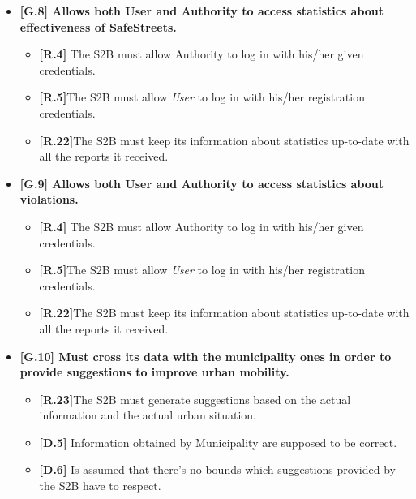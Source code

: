 \begin{itemize}
    \newpage
    
\item \textbf{{[G.8]} Allows both User and Authority to access statistics about effectiveness of SafeStreets.}

    \begin{itemize}
           
 \item \textbf{[R.4]} The S2B must allow Authority to log in with his/her given credentials.
        
        
        \item \textbf{[R.5]}The S2B must allow \textit{User} to log in with his/her registration credentials.
        
        \item \textbf{[R.22]}The S2B must keep its information about statistics up-to-date with all the reports it received.
        
    \end{itemize}
    
\item \textbf{{[G.9]} Allows both User and Authority to access statistics about violations.}
     \begin{itemize}
       \item \textbf{[R.4]} The S2B must allow Authority to log in with his/her given credentials.
        
        
        \item \textbf{[R.5]}The S2B must allow \textit{User} to log in with his/her registration credentials.
        
        \item \textbf{[R.22]}The S2B must keep its information about statistics up-to-date with all the reports it received.
        
    \end{itemize}
    
    
\item \textbf{{[G.10]} Must cross its data with the municipality ones in order to provide suggestions to improve urban mobility.}
    \begin{itemize}
        
        
        
         
         \item \textbf{[R.23]}The S2B must generate suggestions based on the actual information and the actual urban situation.
       
       \item \textbf{[D.5]} Information obtained by Municipality are supposed to be correct.
    \item \textbf{[D.6]} Is assumed that there's no bounds which suggestions provided by the S2B have to respect.
         

\end{itemize}
\end{itemize}
